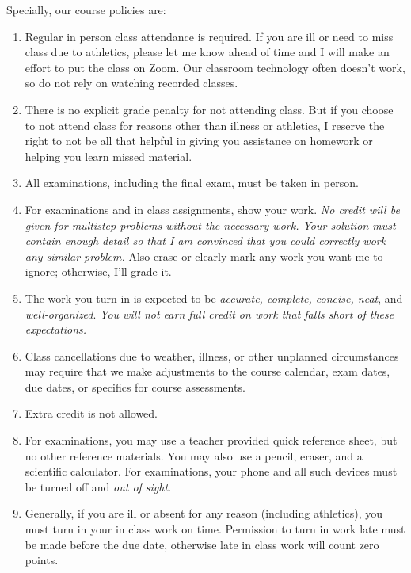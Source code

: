 \documentclass[12pt]{article}
\newcounter{ex}\setcounter{ex}{0}
\begin{document}
\normalsize
Specially, our course policies are:
\begin{enumerate}

\item Regular in person class attendance is required. If you are ill or need to miss 
class due to athletics, please let me know ahead of time and I will make an effort to put the class on Zoom. 
Our classroom technology often doesn't work, so do not rely on watching recorded classes.

\item There is no explicit grade penalty for not attending class. But if you choose to not attend class for reasons other
than illness or athletics, I reserve the right to not be all that helpful in giving you assistance on homework or helping 
you learn missed material.

\item All examinations, including the final exam, must be taken in person.

\item For examinations and in class assignments, show your work.  \emph{No credit will be given for multistep problems without the necessary work. Your solution must contain enough detail
so that I am convinced that you could correctly work any similar problem.} Also erase or clearly mark any work you want me to ignore; otherwise,
I'll grade it.  

\item The work you turn in is expected to be \emph{accurate, 
complete, concise, neat}, and \emph{well-organized}.  
\emph{You will not earn full credit on work that falls short of 
these expectations.}

\item Class cancellations due to weather, illness, or other 
unplanned circumstances may require that we make  adjustments
to the course calendar, exam dates, due dates, or specifics for 
course assessments. 


\item Extra credit is not allowed. 



\item For examinations, you may use a teacher provided quick reference sheet, 
but no other reference materials. You may also use a pencil, eraser, 
and a scientific calculator. For examinations, your phone and all such
devices must be turned off and \emph{out of sight}. 

\item Generally, if you are ill or absent for any reason (including 
athletics), you must turn in your in class work on time. Permission to
turn in work late must be made before the due date, otherwise late in class work 
will count zero points.


\end{enumerate}
\end{document}

